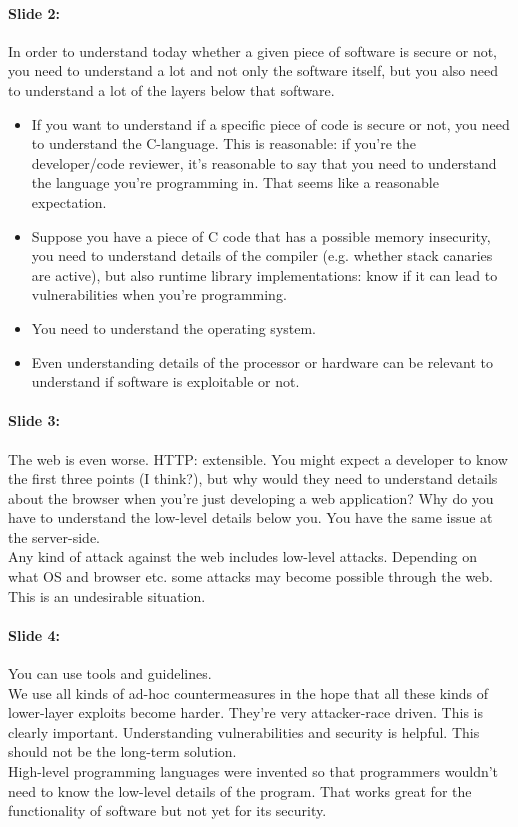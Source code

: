 \documentclass[10pt,a4paper]{report}
\begin{document}
\paragraph{Slide 2:} In order to understand today whether a given piece of software is secure or not, you need to understand a lot and not only the software itself, but you also need to understand a lot of the layers below that software. 
\begin{itemize}
\item If you want to understand if a specific piece of code is secure or not, you need to understand the C-language. This is reasonable: if you're the developer/code reviewer, it's reasonable to say that you need to understand the language you're programming in. That seems like a reasonable expectation.
\item Suppose you have a piece of C code that has a possible memory insecurity, you need to understand details of the compiler (e.g. whether stack canaries are active), but also runtime library implementations: know if it can lead to vulnerabilities when you're programming.
\item You need to understand the operating system. \\
\item Even understanding details of the processor or hardware can be relevant to understand if software is exploitable or not. 
\end{itemize}

\paragraph{Slide 3:} The web is even worse. HTTP: extensible. You might expect a developer to know the first three points (I think?), but why would they need to understand details about the browser when you're just developing a web application? Why do you have to understand the low-level details below you. You have the same issue at the server-side.\\
Any kind of attack against the web includes low-level attacks. Depending on what OS and browser etc. some attacks may become possible through the web. \\
This is an undesirable situation.

\paragraph{Slide 4:} You can use tools and guidelines.\\
We use all kinds of ad-hoc countermeasures in the hope that all these kinds of lower-layer exploits become harder. They're very attacker-race driven. This is clearly important. Understanding vulnerabilities and security is helpful. This should not be the long-term solution.\\
High-level programming languages were invented so that programmers wouldn't need to know the low-level details of the program. That works great for the functionality of software but not yet for its security.
\end{document}
